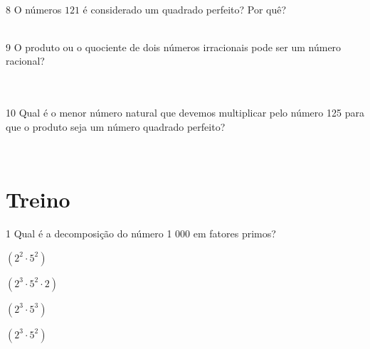 \\

\num{8} O números $121$ é considerado um quadrado perfeito? Por quê?

\\

\num{9} O produto ou o quociente de dois números irracionais pode ser um
número racional?


\\

\\


\num{10} Qual é o menor número natural que devemos multiplicar pelo número
125 para que o produto seja um número quadrado perfeito?

\\

\section{Treino}

\num{1} Qual é a decomposição do número 1 000 em fatores primos?

\begin{escolha}
\item $(2^2\cdot 5^2)$
\item $(2^3 \cdot 5^2 \cdot 2)$
\item $(2^3 \cdot 5^3)$
\item $(2^3 \cdot 5^2)$
\end{escolha}










